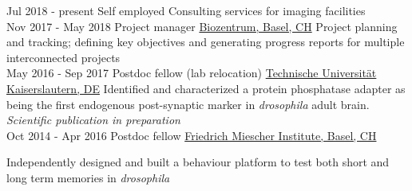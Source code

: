 \documentclass[a4paper]{twentysecondcv} %
\begin{document}
\begin{twenty} %
\twentyitem %
    	{Jul 2018 -}
		{present}
        {Self employed}
        {}
        {}
        {Consulting services for imaging facilities }
        \\
\twentyitem %
    	{Nov 2017 -}
		{May 2018}
        {Project manager}
        {\href{https://www.biozentrum.unibas.ch/home/}{Biozentrum, Basel, CH}}
        { }
        {Project planning and tracking; defining key objectives and generating progress reports for multiple interconnected projects 
        }
        \\
\twentyitem
    	{May 2016 -}
		{Sep 2017}
        {Postdoc fellow (lab relocation)}
        {\href{http://www.uni-kl.de/en/home/}{Technische Universität Kaiserslautern, DE}}
        { }
        { Identified and characterized a protein phosphatase adapter as being the first endogenous post-synaptic marker in \textit{drosophila} adult brain.  \textit {Scientific publication in preparation}
       }
        \\
        
	\twentyitem
    	{Oct 2014 -}
		{Apr 2016}
        {Postdoc fellow}
        {\href{http://www.fmi.ch/}{Friedrich Miescher Institute, Basel, CH}}
        { }
        { Independently designed and built a behaviour platform to test both short and long term memories in \textit{drosophila}
    
    }

        
\end{twenty}
\end{document}
